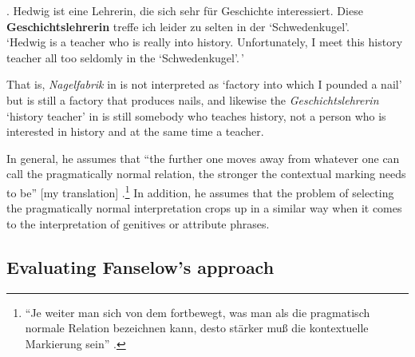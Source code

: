 \ex. Hedwig ist eine Lehrerin, die sich sehr für Geschichte
interessiert. Diese \textbf{Geschichts\-lehrerin} treffe ich leider zu selten in der `Schwedenkugel'.\\
`Hedwig is a teacher who is really into history. Unfortunately, I meet this history teacher all too seldomly in the `Schwedenkugel'.\,'

That is, \emph{Nagelfabrik} in \LLast is not interpreted as `factory
into which I pounded a nail' but is still a factory that produces
nails, and likewise the \emph{Geschichtslehrerin} `history teacher' in
\Last is still somebody who teaches history, not a person who is
interested in history and at the same time a teacher.
 
In general, he assumes
  that ``the further one moves away from whatever one can call the
  pragmatically normal relation, the stronger the contextual marking needs to
  be'' [my translation] \citet[221]{Fanselow:1981}.\footnote{``Je weiter man sich von dem fortbewegt, was man als die pragmatisch
  normale Relation bezeichnen kann, desto stärker muß die kontextuelle
  Markierung sein'' \citep[221]{Fanselow:1981}.} 
In addition, he assumes that
  the problem of selecting the pragmatically normal interpretation crops up
  in a similar way when it comes to the interpretation of genitives or
  attribute phrases.


\subsection{Evaluating Fanselow's approach}

